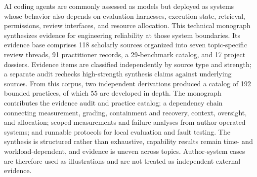 AI coding agents are commonly assessed as models but deployed as systems whose behavior also depends on evaluation harnesses, execution state, retrieval, permissions, review interfaces, and resource allocation. This technical monograph synthesizes evidence for engineering reliability at those system boundaries. Its evidence base comprises 118 scholarly sources organized into seven topic-specific review threads, 91 practitioner records, a 29-benchmark catalog, and 17 project dossiers. Evidence items are classified independently by source type and strength; a separate audit rechecks high-strength synthesis claims against underlying sources. From this corpus, two independent derivations produced a catalog of 192 bounded practices, of which 55 are developed in depth. The monograph contributes the evidence audit and practice catalog; a dependency chain connecting measurement, grading, containment and recovery, context, oversight, and allocation; scoped measurements and failure analyses from author-operated systems; and runnable protocols for local evaluation and fault testing. The synthesis is structured rather than exhaustive, capability results remain time- and workload-dependent, and evidence is uneven across topics. Author-system cases are therefore used as illustrations and are not treated as independent external evidence.

